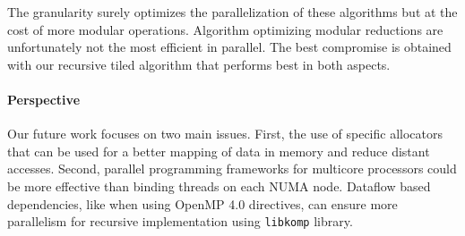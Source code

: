 \documentclass{article}
\newcommand{\libkomp}{\texttt{libkomp}\xspace}
\begin{document}
The granularity surely optimizes the parallelization of these
algorithms but at the cost of more modular operations. 
Algorithm optimizing modular reductions are unfortunately not the most efficient
in parallel. The best compromise is obtained with our recursive tiled algorithm
that performs best in both aspects.
 
 
 
 
 
 
 
 
 
\vspace{-1em}
\paragraph{Perspective}
Our future work focuses on two main issues. First, the use of specific allocators
that can be used for a better mapping of data in memory and reduce distant accesses.
Second, parallel programming frameworks for multicore processors \cite{KLDB10}
could be more effective than binding threads on each NUMA node.  
Dataflow based dependencies, like when using OpenMP 4.0 directives, 
can ensure more parallelism for recursive implementation using \libkomp\cite{BGD12} library.
 
 

 
 
 
 

 
 
 
 

 
\vspace{-1em}
{\scriptsize


}
 

 
 
 
 

 
 
 
 
 
 
 
 

 
 
 
 

 
 
 
 
 
 

 
 
 
 

 
 
 
 
 

 
 
 
 
 
 

 
 
 
 
 

 
 
 
 
 

 
 
 
 
 

 
 
 
 
 
 

 
 
 
 
 

 
\end{document}
